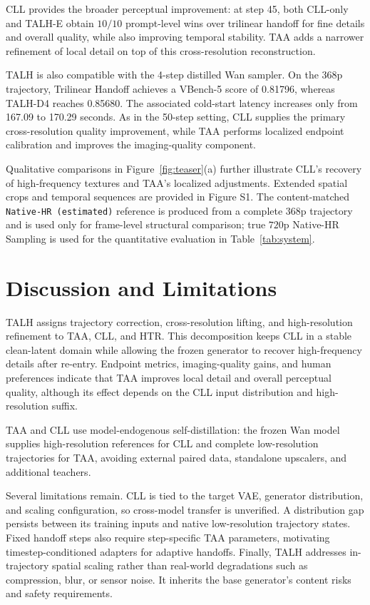 CLL provides the broader perceptual improvement: at step 45, both
CLL-only and TALH-E obtain \(10/10\) prompt-level wins over trilinear
handoff for fine details and overall quality, while also improving
temporal stability. TAA adds a narrower refinement of local detail on
top of this cross-resolution reconstruction.

TALH is also compatible with the 4-step distilled Wan sampler. On the
\(368\text{p}\) trajectory, Trilinear Handoff achieves a VBench-5 score
of 0.81796, whereas TALH-D4 reaches 0.85680. The associated cold-start
latency increases only from 167.09 to 170.29 seconds. As in the 50-step
setting, CLL supplies the primary cross-resolution quality improvement,
while TAA performs localized endpoint calibration and improves the
imaging-quality component.

Qualitative comparisons in Figure~\ref{fig:teaser}(a) further illustrate
CLL's recovery of high-frequency textures and TAA's localized
adjustments. Extended spatial crops and temporal sequences are provided
in Figure S1. The content-matched
\texttt{Native-HR (estimated)} reference is produced from a complete
\(368\text{p}\) trajectory and is used only for frame-level structural
comparison; true \(720\text{p}\) Native-HR Sampling is used for the
quantitative evaluation in Table~\ref{tab:system}.

\section{Discussion and Limitations}

TALH assigns trajectory correction, cross-resolution lifting, and
high-resolution refinement to TAA, CLL, and HTR. This decomposition
keeps CLL in a stable clean-latent domain while allowing the frozen
generator to recover high-frequency details after re-entry. Endpoint
metrics, imaging-quality gains, and human preferences indicate that TAA
improves local detail and overall perceptual quality, although its effect
depends on the CLL input distribution and high-resolution suffix.

TAA and CLL use model-endogenous self-distillation: the frozen Wan model
supplies high-resolution references for CLL and complete low-resolution
trajectories for TAA, avoiding external paired data, standalone
upscalers, and additional teachers.

Several limitations remain. CLL is tied to the target VAE, generator
distribution, and scaling configuration, so cross-model transfer is
unverified. A distribution gap persists between its training inputs and
native low-resolution trajectory states. Fixed handoff steps also
require step-specific TAA parameters, motivating timestep-conditioned
adapters for adaptive handoffs. Finally, TALH addresses in-trajectory
spatial scaling rather than real-world degradations such as compression,
blur, or sensor noise. It inherits the base generator's content risks
and safety requirements.

